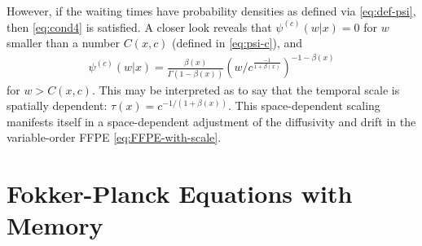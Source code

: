 \documentclass[a4paper,12pt]{elsarticle}
\numberwithin{equation}{section}
\theoremstyle{plain}
\theoremstyle{definition}
\theoremstyle{remark}
\numberwithin{equation}{section}
\newcommand{\1}{\mathbf 1}
\begin{document}
However, if the waiting times have probability densities as defined via 
\eqref{eq:def-psi}, then \eqref{eq:cond4} is satisfied. 
A closer look reveals that $\psi^{(c)}(w|x) = 0$ for $w$ smaller than 
a number $C(x,c)$ (defined in \eqref{eq:psi-c}), and 
\begin{align}
\psi^{(c)}(w|x) 
= \frac{\beta(x)}{\Gamma(1-\beta(x))} 
\left(w / c^\frac{-1}{1+\beta(x)} \right)^{-1-\beta(x)}
\end{align}
for $w > C(x,c)$. 
This may be interpreted as to say that the temporal scale is spatially 
dependent: $\tau(x) = c^{-1/(1+\beta(x))}$.
This space-dependent scaling manifests itself in a space-dependent 
adjustment of the diffusivity and drift in the variable-order FFPE
\eqref{eq:FFPE-with-scale}.


\section{Fokker-Planck Equations with Memory}
\label{sec:FFPE}
\end{document}
